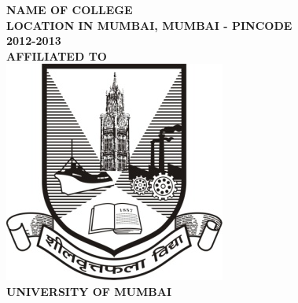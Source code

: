 \begin{center}
\Large{\textbf{NAME OF COLLEGE}}\\
\large{\textbf{LOCATION IN MUMBAI, MUMBAI - PINCODE}}
\large{\textbf{\\2012-2013}}\\[0.5cm]
\Large{\textbf{AFFILIATED TO}}\\[0.5cm]
\includegraphics[scale=1.0]{project/images/uop-logo}\\
\LARGE{\textbf{UNIVERSITY OF MUMBAI}}
\newpage

\end{center}